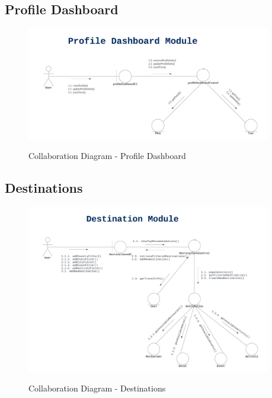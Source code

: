 \documentclass[12pt]{article}
\begin{document}
\subsection{Profile Dashboard}
\begin{figure}[H]
    \centering
        \includegraphics[width=0.95\textwidth]{Collaboration Diagram/Profile Dashboard.png}
        \label{fig:CollabDash}
    \caption{Collaboration Diagram - Profile Dashboard}
\end{figure}

\newpage
\subsection{Destinations}
\begin{figure}[H]
    \centering
        \includegraphics[width=0.95\textwidth]{Collaboration Diagram/Destinations.png}
        \label{fig:CollabDest}
    \caption{Collaboration Diagram - Destinations}
\end{figure}
\end{document}
